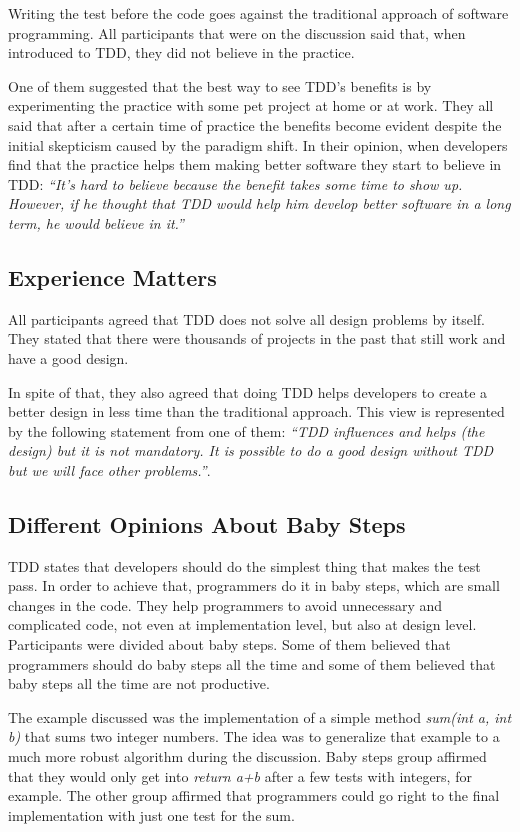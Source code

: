 Writing the test before the code goes against the traditional approach of
software programming. 
All participants that were on the discussion said that, when introduced to TDD,
they did not believe in the practice.

One of them suggested that the best way to see TDD's benefits is by
experimenting the practice with some pet project at home or at work.
They all said that after a certain time of practice the benefits become evident
despite the initial skepticism caused by the paradigm shift.
In their opinion, when developers find that the practice helps them making
better software they start to believe in TDD: \textit{``It's hard to believe
because the benefit takes some time to show up. However, if he thought that TDD
would help him develop better software in a long term, he would believe in it.''}

\subsection{Experience Matters}
\label{subsec:experience}

All participants agreed that TDD does not solve all design problems by itself.
They stated that there were thousands of projects in the past that still work
and have a good design. 

In spite of that, they also agreed that doing TDD helps
developers to create a better design in less time than the traditional approach.
This view is represented by the following statement from one of them:
\textit{``TDD influences and helps (the design) but it is not mandatory. It is
possible to do a good design without TDD but we will face other problems.''}.

\subsection{Different Opinions About Baby Steps}

TDD states that developers should do the simplest thing that
makes the test pass. In order to achieve that, programmers do it in baby steps,
which are small changes in the code. They help programmers to avoid
unnecessary and complicated code, not even at implementation level, but also at
design level.
Participants were divided about baby steps. Some of them believed that
programmers should do baby steps all the time and some of them believed that
baby steps all the time are not productive.

The example discussed was the implementation of a simple method
\textit{sum(int a, int b)} that sums two integer numbers. The idea was to
generalize that example to a much more robust algorithm during the discussion.
Baby steps group affirmed that they would only get into \textit{return a+b}
after a few tests with integers, for example. The other group affirmed that
programmers could go right to the final implementation with just one test for
the sum.

